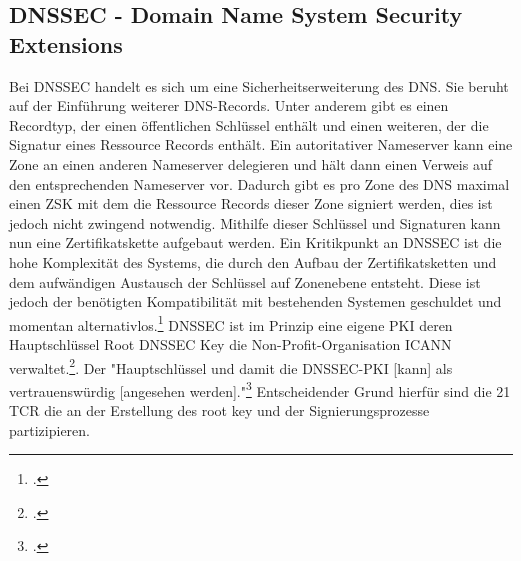 \documentclass  [paper=a4,
				fontsize=12pt,
				listof=totoc,
				bibliography=totoc
				]{scrreprt}
\begin{document}
		\subsection{DNSSEC - Domain Name System Security Extensions}
		\label{subsec:dnssec}
			Bei \ac{DNSSEC} handelt es sich um eine Sicherheitserweiterung des \ac{DNS}.
			Sie beruht auf der Einführung weiterer \ac{DNS}-Records.
			Unter anderem gibt es einen Recordtyp, der einen öffentlichen Schlüssel enthält und einen weiteren, der die Signatur eines Ressource Records enthält.
			Ein autoritativer Nameserver kann eine Zone an einen anderen Nameserver delegieren und hält dann einen Verweis auf den entsprechenden Nameserver vor.
			Dadurch gibt es pro Zone des \ac{DNS} maximal einen \ac{ZSK} mit dem die Ressource Records dieser Zone signiert werden, dies ist jedoch nicht zwingend notwendig.
			Mithilfe dieser Schlüssel und Signaturen kann nun eine Zertifikatskette aufgebaut werden.
			Ein Kritikpunkt an \ac{DNSSEC} ist die hohe Komplexität des Systems, die durch den Aufbau der Zertifikatsketten und dem aufwändigen Austausch der Schlüssel auf Zonenebene entsteht.
			Diese ist jedoch der benötigten Kompatibilität mit bestehenden Systemen geschuldet und momentan alternativlos.\footcite[Vgl.][S. 195]{Sorge2013}
			\ac{DNSSEC} ist im Prinzip eine eigene \ac{PKI} deren Hauptschlüssel Root DNSSEC Key die Non-Profit-Organisation \ac{ICANN} verwaltet.\footcite{Koetter2014}. Der "Hauptschlüssel und damit die \ac{DNSSEC}-\ac{PKI} [kann] als vertrauenswürdig [angesehen werden]."\footcite{Koetter2014} Entscheidender Grund hierfür sind die 21 \ac{TCR} die an der Erstellung des root key und der Signierungsprozesse partizipieren.
	
\end{document}
